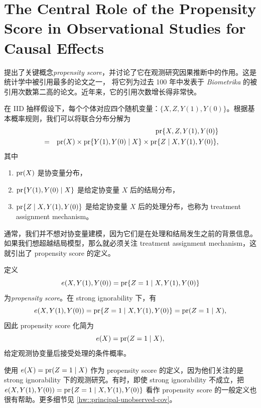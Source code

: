 
\chapter{The Central Role of the Propensity Score in Observational Studies for Causal Effects}\label{chapter::pscore-key}
 
 
\citet{rosenbaum1983central} 提出了关键概念{\it propensity score}，并讨论了它在观测研究因果推断中的作用。这是统计学中被引用最多的论文之一，\citet{titterington2013biometrika} 将它列为过去 100 年中发表于 {\it Biometrika} 的被引用次数第二高的论文。近年来，它的引用次数增长得非常快。


在 IID 抽样假设下，每个个体对应四个随机变量：$\{  X, Z, Y(1), Y(0) \} $。根据基本概率规则，我们可以将联合分布分解为
\begin{eqnarray*}
&&\textup{pr} \{  X, Z, Y(1), Y(0) \}  \\
 &=& \textup{pr}(X)  
\times   \textup{pr}\{ Y(1), Y(0) \mid X \}   
\times  \textup{pr}\{  Z\mid X, Y(1), Y(0)  \} ,
\end{eqnarray*}
其中
\begin{enumerate}
\item
 $\textup{pr}(X)$ 是协变量分布，
 \item
 $\textup{pr}\{ Y(1), Y(0) \mid X \}$ 是给定协变量 $X$ 后的结局分布，
 \item
 $\textup{pr}\{  Z\mid X, Y(1), Y(0)  \}$ 是给定协变量 $X$ 后的处理分布，也称为 treatment assignment mechanism。
\end{enumerate}
通常，我们并不想对协变量建模，因为它们是在处理和结局发生之前的背景信息。如果我们想超越结局模型，那么就必须关注 treatment assignment mechanism，这就引出了 propensity score 的定义。

\begin{definition}
\label{def::pscore}
定义
$$
e(X, Y(1), Y(0)   ) = \textup{pr}\{  Z=1\mid X, Y(1), Y(0)  \}
$$
为{\it propensity score}。在 strong ignorability 下，有
$$
 e(X, Y(1), Y(0)   )  = \textup{pr}\{  Z=1\mid X, Y(1), Y(0)  \} = \textup{pr}(Z=1 \mid X),
$$
因此 propensity score 化简为
$$
e(X) = \textup{pr}(Z=1 \mid X),
$$
给定观测协变量后接受处理的条件概率。
\end{definition} 

 
\citet{rosenbaum1983central} 使用 $e(X) = \textup{pr}(Z=1 \mid X)$ 作为 propensity score 的定义，因为他们关注的是 strong ignorability 下的观测研究。有时，即使 strong ignorability 不成立，把 $e(X, Y(1), Y(0)   ) = \textup{pr}\{  Z=1\mid X, Y(1), Y(0)  \}$ 看作 propensity score 的一般定义也很有帮助。更多细节见 \cref{hw::principal-unobserved-cov}。

